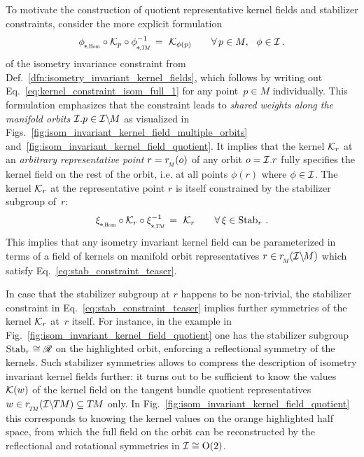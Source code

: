 To motivate the construction of quotient representative kernel fields and stabilizer constraints, consider the more explicit formulation
\begin{align}\label{eq:isom_invariant_kernel_constraint_explicit}
    \dphiHom \!\circ \Kp \circ \dphiTMinv \,=\ \Kphip \qquad \forall\, p\in M,\ \  \phi\in\I \,.
\end{align}
of the isometry invariance constraint from Def.~\ref{dfn:isometry_invariant_kernel_fields}, which follows by writing out Eq.~\eqref{eq:kernel_constraint_isom_full_1} for any point~${p\in M}$ individually.
This formulation emphasizes that the constraint leads to \emph{shared weights along the manifold orbits} $\mathcal{I}.p \in \mathcal{I}\backslash\mkern-1.5mu M$ as visualized in Figs.~\ref{fig:isom_invariant_kernel_field_multiple_orbits} and~\ref{fig:isom_invariant_kernel_field_quotient}.
It implies that the kernel $\mathcal{K}_r$ at an \emph{arbitrary representative point} $r = \rM(o)$ of any orbit $o = \mathcal{I}.r$ fully specifies the kernel field on the rest of the orbit, i.e. at all points $\phi(r)$ where $\phi\in\mathcal{I}$.
The kernel $\mathcal{K}_r$ at the representative point $r$ is itself constrained by the stabilizer subgroup of~$r$:
\begin{align}\label{eq:stab_constraint_teaser}
    \dxiHom \!\circ \Kr \circ \dxiTMinv \,=\ \Kr \qquad \forall\, \xi\in\Stab{r} \,.
\end{align}
This implies that any isometry invariant kernel field can be parameterized in terms of a field of kernels on manifold orbit representatives $r \in \rM(\IM)$ which satisfy Eq.~\eqref{eq:stab_constraint_teaser}.

In case that the stabilizer subgroup at $r$ happens to be non-trivial, the stabilizer constraint in Eq.~\eqref{eq:stab_constraint_teaser} implies further symmetries of the kernel $\mathcal{K}_r$ at~$r$ itself.
For instance, in the example in Fig.~\ref{fig:isom_invariant_kernel_field_quotient} one has the stabilizer subgroup ${\operatorname{Stab}_{r} \cong \mathscr{R}}$ on the highlighted orbit, enforcing a reflectional symmetry of the kernels.
Such stabilizer symmetries allows to compress the description of isometry invariant kernel fields further:
it turns out to be sufficient to know the values $\mathcal{K}(w)$ of the kernel field on the tangent bundle quotient representatives $w \in \rTM(\ITM) \subseteq \TM$ only.
In Fig.~\ref{fig:isom_invariant_kernel_field_quotient} this corresponds to knowing the kernel values on the orange highlighted half space, from which the full field on the orbit can be reconstructed by the reflectional and rotational symmetries in $\mathcal{I}\cong\operatorname{O}(2)$.




